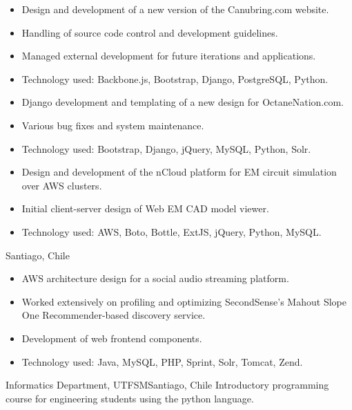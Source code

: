 \documentclass[sans,letter]{moderncv}
\begin{document}
{\begin{itemize}
  \item Design and development of a new version of the Canubring.com website.
  \item Handling of source code control and development guidelines.
  \item Managed external development for future iterations and
  applications.
  \item Technology used: Backbone.js, Bootstrap, Django, PostgreSQL, Python.
\end{itemize}}

{\begin{itemize}
  \item Django development and templating of a new design for OctaneNation.com.
  \item Various bug fixes and system maintenance.
  \item Technology used: Bootstrap, Django, jQuery, MySQL, Python, Solr.
\end{itemize}}

{}{\begin{itemize}
  \item Design and development of the nCloud platform for EM circuit simulation
  over AWS clusters.
  \item Initial client-server design of Web EM CAD model viewer.
  \item Technology used: AWS, Boto, Bottle, ExtJS, jQuery, Python, MySQL.
\end{itemize}}

{Santiago, Chile}{}{\begin{itemize}
  \item AWS architecture design for a social audio streaming platform.
  \item Worked extensively on profiling and optimizing SecondSense's Mahout Slope One Recommender-based discovery service.
  \item Development of web frontend components.
  \item Technology used: Java, MySQL, PHP, Sprint, Solr, Tomcat, Zend.
\end{itemize}}

{Informatics Department, UTFSM}{Santiago, Chile}{}
{Introductory programming course for engineering students using the
python language.}
\end{document}
